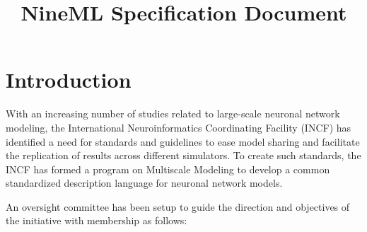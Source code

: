 \documentclass[a4paper]{article}
\begin{document}
\title{NineML Specification Document}

\newpage
\pagestyle{plain}

\tableofcontents

\section{Introduction}

With an increasing number of studies related to large-scale neuronal
network modeling, the International Neuroinformatics Coordinating
Facility (INCF) has identified a need for standards and guidelines to
ease model sharing and facilitate the replication of results across
different simulators. To create such standards, the INCF has formed a
program on Multiscale Modeling to develop a common standardized
description language for neuronal network models.

An oversight committee has been setup to guide the direction and
objectives of the initiative with membership as follows:
\end{document}
